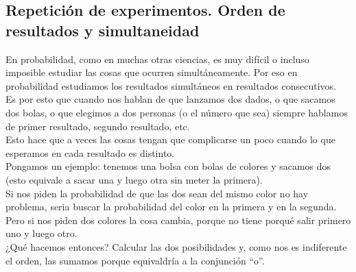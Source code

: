 \documentclass[a4paper,10pt,answers]{exam}
\begin{document}
\subsection{Repetición de experimentos. Orden de resultados y simultaneidad}
En probabilidad, como en muchas otras ciencias, es muy difícil o incluso imposible estudiar las cosas que ocurren simultáneamente. Por eso en probabilidad estudiamos los resultados simultáneos en resultados consecutivos.\\
Es por esto que cuando nos hablan de que lanzamos dos dados, o que sacamos dos bolas, o que elegimos a dos personas (o el número que sea) siempre hablamos de primer resultado, segundo resultado, etc.\\

Esto hace que a veces las cosas tengan que complicarse un poco cuando lo que esperamos en cada resultado es distinto.\\
Pongamos un ejemplo: tenemos una bolsa con bolas de colores y sacamos dos (esto equivale a sacar una y luego otra sin meter la primera).\\
Si nos piden la probabilidad de que las dos sean del mismo color no hay problema, seria buscar la probabilidad del color en la primera y en la segunda.\\
Pero si nos piden dos colores la cosa cambia, porque no tiene porqué salir primero uno y luego otro.\\
¿Qué hacemos entonces? Calcular las dos posibilidades y, como nos es indiferente el orden, las sumamos porque equivaldría a la conjunción ``o''.\\
\end{document}
